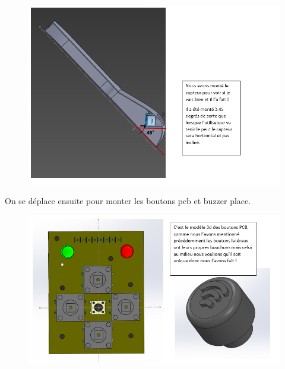 \begin{figure}[!htbp]
    \centering
    \includegraphics[width=\linewidth]{assets/conception1/24.png}
\end{figure}

\FloatBarrier

On se déplace ensuite pour monter les boutons pcb et buzzer place.

\begin{figure}[!htbp]
    \centering
    \includegraphics[width=\linewidth]{assets/conception1/25.png}
\end{figure}

\FloatBarrier

